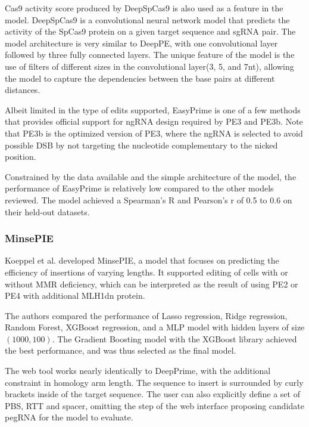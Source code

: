 \documentclass[12pt]{article}
\begin{document}
Cas9 activity score produced by DeepSpCas9 is also used as a feature in the model. DeepSpCas9 is a convolutional neural network model that predicts the activity of the SpCas9 protein on a given target sequence and sgRNA pair. The model architecture is very similar to DeepPE, with one convolutional layer followed by three fully connected layers. The unique feature of the model is the use of filters of different sizes in the convolutional layer(3, 5, and 7nt), allowing the model to capture the dependencies between the base pairs at different distances\cite{kimSpCas9ActivityPrediction2019}.

Albeit limited in the type of edits supported, EasyPrime is one of a few methods that provides official support for ngRNA design required by PE3 and PE3b. Note that PE3b is the optimized version of PE3, where the ngRNA is selected to avoid possible DSB by not targeting the nucleotide complementary to the nicked position\cite{liudavidr.SearchandreplaceGenomeEditing2019}.

Constrained by the data available and the simple architecture of the model, the performance of EasyPrime is relatively low compared to the other models reviewed. The model achieved a Spearman's R and Pearson's r of 0.5 to 0.6 on their held-out datasets.

\subsubsection{MinsePIE}

\label{sec:minsepie}

Koeppel et al. developed MinsePIE, a model that focuses on predicting the efficiency of insertions of varying lengths. It supported editing of cells with or without MMR deficiency, which can be interpreted as the result of using PE2 or PE4 with additional MLH1dn protein. 

The authors compared the performance of Lasso regression, Ridge regression, Random Forest, XGBoost regression, and a MLP model with hidden layers of size $(1000, 100)$. The Gradient Boosting model with the XGBoost library achieved the best performance, and was thus selected as the final model. 

The web tool works nearly identically to DeepPrime, with the additional constraint in homology arm length. The sequence to insert is surrounded by curly brackets inside of the target sequence. The user can also explicitly define a set of PBS, RTT and spacer, omitting the step of the web interface proposing candidate pegRNA for the model to evaluate. 
\end{document}
